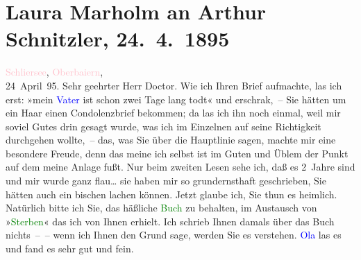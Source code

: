 

               \section[Laura Marholm an Arthur Schnitzler, 24. 4. 1895]{ Laura Marholm an Arthur Schnitzler, 24. 4. 1895}\nopagebreak{}\rehead{ }\normalsize\beginnumbering{} \toendnotes[C]{\smallbreak\pagebreak[2]} 
\toendnotes[C]{\smallbreak}\pstart
           \raggedleft{}{\pb}\textcolor{pink}{Schliersee}{}\ledrightnote{\textcolor{pink}{Schliersee}}, \textcolor{pink}{Oberbaiern}{}\ledrightnote{\textcolor{pink}{Oberbayern}},{\\}24 April 95.\pend
           \pstart{}Sehr geehrter Herr Doctor.\pend\pstart
           Wie ich Ihren Brief aufmachte, las ich erst: »mein \textcolor{blue}{Vater}{} ist schon zwei Tage lang todt« und erschrak, –
                    Sie hätten um ein Haar einen Condolenzbrief bekommen; da las ich ihn noch
                    einmal, weil mir soviel Gutes drin gesagt wurde, was ich im Einzelnen auf seine
                    Richtigkeit durchgehen wollte, – das, was Sie über die Hauptlinie sagen, machte
                    mir eine besondere Freude, denn das meine ich selbst ist im Guten und Üblem der
                    Punkt auf dem meine Anlage fußt. Nur beim zweiten Lesen sehe ich, daß es 2 Jahre
                    sind und mir wurde ganz flau{\dots} sie haben mir so
                    grundernsthaft geschrieben, Sie hätten auch ein bischen lachen können. Jetzt
                    glaube ich, Sie thun es heimlich.\pend
           \pstart
           Natürlich bitte ich Sie, das häßliche \textcolor{green}{Buch}{} zu behalten, im Austausch von »\textcolor{green}{Sterben}{}\ledrightnote{\textcolor{green}{Sterben. Novelle}}« {\pb}das ich von Ihnen
                    erhielt. Ich schrieb Ihnen damals über das Buch nichts – – wenn ich Ihnen den
                    Grund sage, werden Sie es verstehen. \textcolor{blue}{Ola}{}\ledrightnote{\textcolor{blue}{Ola Hansson}} las
                    es und fand es sehr gut und fein.\pend
           \pstart
